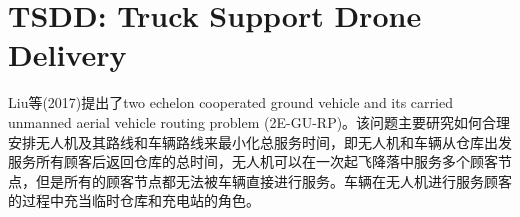 \part{TSDD: Truck Support Drone Delivery}
Liu等(2017)\cite{luoTwoEchelonCooperatedRouting2017}提出了two echelon cooperated ground vehicle and its carried unmanned aerial vehicle routing problem (2E-GU-RP)。该问题主要研究如何合理安排无人机及其路线和车辆路线来最小化总服务时间，即无人机和车辆从仓库出发服务所有顾客后返回仓库的总时间，无人机可以在一次起飞降落中服务多个顾客节点，但是所有的顾客节点都无法被车辆直接进行服务。车辆在无人机进行服务顾客的过程中充当临时仓库和充电站的角色。

